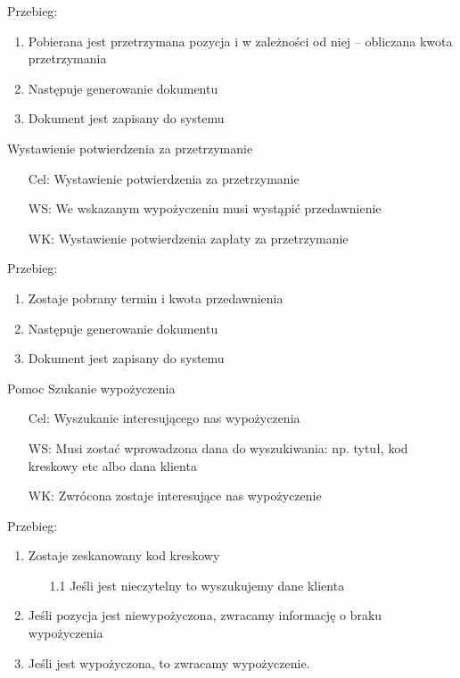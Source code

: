 \documentclass{article}
\begin{document}
	Przebieg:\newline
	\begin{enumerate}
		\item Pobierana jest przetrzymana pozycja i w zależności od niej – obliczana kwota przetrzymania
		\item Następuje generowanie dokumentu
		\item Dokument jest zapisany do systemu
	\end{enumerate}

	\Large	Wystawienie potwierdzenia za przetrzymanie \newline
	\normalsize
	\begin{enumerate}
		\item[Cel:] Wystawienie potwierdzenia za przetrzymanie
		\item[WS:] We wskazanym wypożyczeniu musi wystąpić przedawnienie
		\item[WK:] Wystawienie potwierdzenia zapłaty za przetrzymanie
	\end{enumerate}
	
	Przebieg:\newline
	\begin{enumerate}
		\item Zostaje pobrany termin i kwota przedawnienia 
		\item Następuje generowanie dokumentu
		\item Dokument jest zapisany do systemu
	\end{enumerate}
	
\LARGE	Pomoc\newline
\Large	Szukanie wypożyczenia\newline
\normalsize
\begin{enumerate}
	\item[Cel:] Wyszukanie interesującego nas wypożyczenia
	\item[WS:] Musi zostać wprowadzona dana do wyszukiwania: np. tytuł, kod kreskowy etc albo dana klienta
	\item[WK:] Zwrócona zostaje interesujące nas wypożyczenie
\end{enumerate}

Przebieg:
\begin{enumerate}
	\item Zostaje zeskanowany kod kreskowy 
	\begin{enumerate}
		\item [1.1] Jeśli jest nieczytelny to wyszukujemy dane klienta
	\end{enumerate}
	\item Jeśli pozycja jest niewypożyczona, zwracamy informację o braku wypożyczenia
	\item Jeśli jest wypożyczona, to zwracamy wypożyczenie.
\end{enumerate}
	
\end{document}
